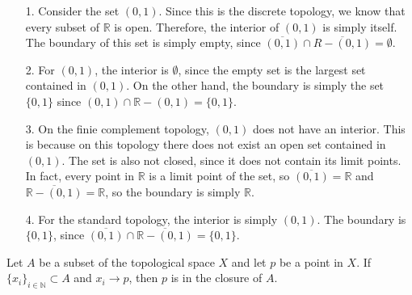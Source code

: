 \documentclass[letterpaper,12pt,twoside]{maths}
\begin{document}
\begin{solution}
    \begin{itemize}
        \item[1.] Consider the set $(0,1).$ Since this is the discrete topology, we
        know that every subset of $\mathbb{R}$ is open. Therefore, the
        interior of $(0,1)$ is simply itself. The boundary of this set is
        simply empty, since $\overline{(0,1)} \cap \overline{R-(0,1)} =
        \emptyset.$
    
        \item[2.] For $(0,1)$, the interior is $\emptyset$, since the empty set is
        the largest set contained in $(0,1)$. On the other hand, the boundary
        is simply the set $\{0, 1\}$ since $(0,1) \cap \mathbb{R} - (0,1) =
        \{0,1\}.$ 
    
        \item[3.] On the finie complement topology, $(0,1)$ does not have an
        interior. This is because on this topology there does not exist an
        open set contained in $(0,1)$. The set is also not closed, since it
        does not contain its limit points. In fact, every point in
        $\mathbb{R}$ is a limit point of the set, so $\overline{(0,1)} =
        \mathbb{R}$ and $\overline{\mathbb{R} - (0,1)} = \mathbb{R}$, so the
        boundary is simply $\mathbb{R}$.
    
        \item[4.] For the standard topology, the interior is simply $(0,1)$. The
        boundary is $\{0, 1\}$, since $\overline{(0,1)} \cap
        \overline{\mathbb{R} - (0,1)} = \{0,1\}.$
    \end{itemize}
\end{solution}

\begin{problem}[Theorem 3.30] Let $A$ be a subset of the topological
    space $X$ and let $p$ be a point in $X$. If $\{x_i\}_{i \in
    \mathbb{N}} \subset A$ and $x_i \rightarrow p$, then $p$ is in the
    closure of $A$.
\end{problem}
\end{document}
